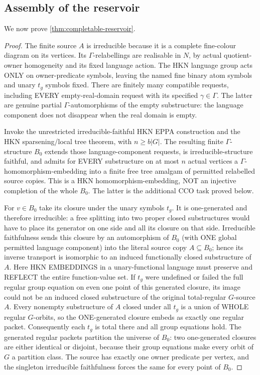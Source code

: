 \subsection{Assembly of the reservoir}

We now prove \cref{thm:completable-reservoir}.

\begin{proof}
The finite source $A$ is irreducible because it is a complete
fine-colour diagram on its vertices. Its $\Gamma$-relabellings
are realisable in $N$, by actual quotient-owner homogeneity
and its fixed language action. The HKN language group acts
ONLY on owner-predicate symbols, leaving the named fine
binary atom symbols and unary $t_g$ symbols fixed.
There are finitely many compatible requests, including
EVERY empty-real-domain request with its specified
$\gamma\in\Gamma$. The latter are genuine partial
$\Gamma$-automorphisms of the empty substructure:
the language component does not disappear when
the real domain is empty.

Invoke the unrestricted irreducible-faithful HKN EPPA
construction and the HKN sparsening/local tree theorem,
with $n\ge b|G|$. The resulting finite $\Gamma$-structure
$B_0$ extends those language-component requests, is
irreducible-structure faithful, and admits for EVERY
substructure on at most $n$ actual vertices a
$\Gamma$-homomorphism-embedding into a finite free
tree amalgam of permitted relabelled source copies.
This is a HKN homomorphism-embedding, NOT an
injective completion of the whole $B_0$.
The latter is the additional CCO task proved below.

For $v\in B_0$ take its closure under the unary symbols
$t_g$.  It is one-generated and therefore irreducible: a free
splitting into two proper closed substructures would have to
place its generator on one side and all its closure on that side.
Irreducible faithfulness sends this closure by
an automorphism of $B_0$ (with ONE global permitted
language component) into the literal source copy
$A\subseteq B_0$; hence its inverse transport
is isomorphic to an induced functionally closed
substructure of $A$. Here HKN EMBEDDINGS in a
unary-functional language must preserve and REFLECT
the entire function-value set. If $t_g$ were
undefined or failed the full regular group equation
on even one point of this generated closure, its
image could not be an induced closed substructure
of the original total-regular $G$-source $A$.
Every nonempty substructure of $A$ closed under
all $t_g$ is a union of WHOLE regular $G$-orbits,
so the ONE-generated closure embeds as exactly
one regular packet. Consequently each
$t_g$ is total there and all group equations
hold. The generated regular packets partition
the universe of $B_0$: two one-generated
closures are either identical or disjoint,
because their group equations make every
orbit of $G$ a partition class.
The source has exactly one owner predicate
per vertex, and the singleton irreducible
faithfulness forces the same for every
point of $B_0$.


\end{proof}
